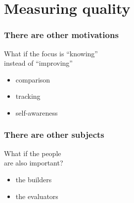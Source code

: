 \documentclass[17pt,aspectratio=169,hyperref=pdfusetitle]{beamer}
\begin{document}
  
  

  

\section{Measuring quality}

\begin{frame}[fragile]
  \frametitle{There are other motivations}

  \begin{flushright}
  What if the focus is ``knowing'' \\
  instead of ``improving'' \\
  \end{flushright}
  
  \begin{itemize}
  \item comparison
  \item tracking
  \item self-awareness
  \end{itemize}
\end{frame}

\begin{frame}[fragile]
  \frametitle{There are other subjects}

  \begin{flushright}
    What if the people \\
    are also important? \\
  \end{flushright}
  
  \begin{itemize}
  \item the builders
  \item the evaluators
  \end{itemize}
\end{frame}
\end{document}
